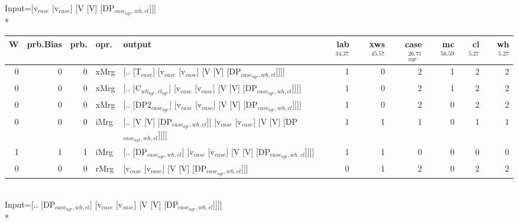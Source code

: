 \begingroup\scriptsize Input=[v$_{case}$ [v$_{case}$] [V [V] [DP$_{case_{agr},wh,cl}$]]]\\*
\begin{tabularx}{\linewidth}{rrrlXrrrrrr}
\hline
   W &   prb.Bias &   prb. & opr.   & output                                                                         &   lab$^{34.37}$ &   xws$^{45.57}$ &   case$_{agr}^{26.71}$ &   mc$^{56.59}$ &   cl$^{5.27}$ &   wh$^{5.27}$ \\
\hline
   0 &       0 &   0 & xMrg & [.. [T$_{case}$] [v$_{case}$ [v$_{case}$] [V [V] [DP$_{case_{agr},wh,cl}$]]]]                    &             1 &             0 &                  2 &            1 &        2 &        2 \\
   0 &       0 &   0 & xMrg & [.. [C$_{wh_{agr},cl_{agr}}$] [v$_{case}$ [v$_{case}$] [V [V] [DP$_{case_{agr},wh,cl}$]]]]           &             1 &             0 &                  2 &            1 &        2 &        2 \\
   0 &       0 &   0 & xMrg & [.. [DP2$_{case_{agr}}$] [v$_{case}$ [v$_{case}$] [V [V] [DP$_{case_{agr},wh,cl}$]]]]              &             1 &             0 &                  2 &            0 &        2 &        2 \\
   0 &       0 &   0 & iMrg & [.. [V [V] [DP$_{case_{agr},wh,cl}$]] [v$_{case}$ [v$_{case}$] [V [V] [DP$_{case_{agr},wh,cl}$]]]] &             1 &             1 &                  1 &            0 &        1 &        1 \\
   1 &       1 &   1 & iMrg & [.. [DP$_{case_{agr},wh,cl}$] [v$_{case}$ [v$_{case}$] [V [V] [DP$_{case_{agr},wh,cl}$]]]]         &             1 &             1 &                  0 &            0 &        0 &        0 \\
   0 &       0 &   0 & rMrg & [v$_{case}$ [v$_{case}$] [V [V] [DP$_{case_{agr},wh,cl}$]]]                                  &             0 &             1 &                  2 &            0 &        2 &        2 \\
\hline
\end{tabularx}\endgroup\\
\begingroup\scriptsize Input=[.. [DP$_{case_{agr},wh,cl}$] [v$_{case}$ [v$_{case}$] [V [V] [DP$_{case_{agr},wh,cl}$]]]]\\*
